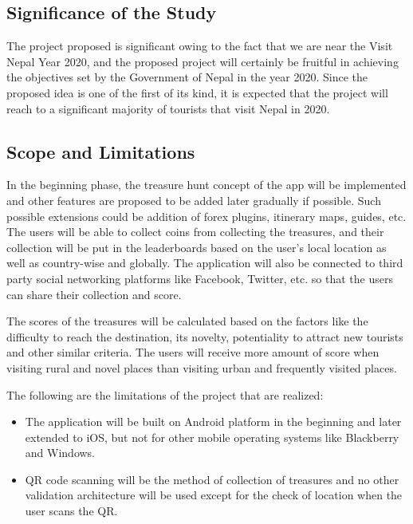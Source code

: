 \documentclass[12pt, a4paper, oneside]{article}
\begin{document}
\subsection{Significance of the Study}
The project proposed is significant owing to the fact that we are near the Visit Nepal Year 2020, and the proposed project will certainly be fruitful in achieving the objectives set by the Government of Nepal in the year 2020. Since the proposed idea is one of the first of its kind, it is expected that the project will reach to a significant majority of tourists that visit Nepal in 2020.

\subsection{Scope and Limitations}
In the beginning phase, the treasure hunt concept of the app will be implemented and other features are proposed to be added later gradually if possible. Such possible extensions could be addition of forex plugins, itinerary maps, guides, etc. The users will be able to collect coins from collecting the treasures, and their collection will be put in the leaderboards based on the user's local location as well as country-wise and globally. The application will also be connected to third party social networking platforms like Facebook, Twitter, etc. so that the users can share their collection and score. 

The scores of the treasures will be calculated based on the factors like the difficulty to reach the destination, its novelty, potentiality to attract new tourists and other similar criteria. The users will receive more amount of score when visiting rural and novel places than visiting urban and frequently visited places.

The following are the limitations of the project that are realized:
\begin{itemize}
 	\item The application will be built on Android platform in the beginning and later extended to iOS, but not for other mobile operating systems like Blackberry and Windows.
	\item QR code scanning will be the method of collection of treasures and no other validation architecture will be used except for the check of location when the user scans the QR.
 \end{itemize}

%
\end{document}
